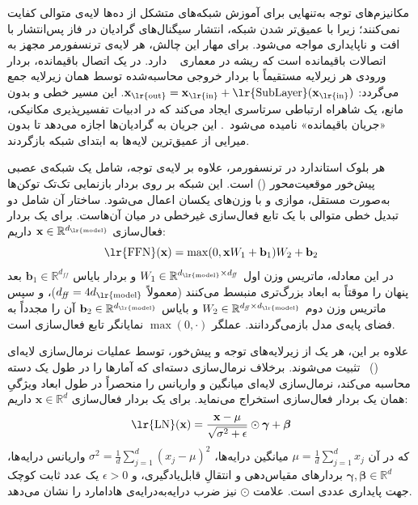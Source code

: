 مکانیزم‌های توجه به‌تنهایی برای آموزش شبکه‌های متشکل از ده‌ها لایه‌ی متوالی کفایت نمی‌کنند؛ زیرا با عمیق‌تر شدن شبکه، انتشار سیگنال‌های گرادیان در فاز پس‌انتشار با افت و ناپایداری مواجه می‌شود. برای مهار این چالش، هر لایه‌ی ترنسفورمر مجهز به اتصالات باقیمانده است که ریشه در معماری ~\cite{he2016deep} دارد. در یک اتصال باقیمانده، بردار ورودی هر زیرلایه مستقیماً با بردار خروجی محاسبه‌شده توسط همان زیرلایه جمع می‌گردد: $\mathbf{x}_{\text{\lr{out}}} = \mathbf{x}_{\text{\lr{in}}} + \text{\lr{SubLayer}}(\mathbf{x}_{\text{\lr{in}}})$. این مسیر خطی و بدون مانع، یک شاهراه ارتباطی سرتاسری ایجاد می‌کند که در ادبیات تفسیرپذیری مکانیکی، «جریان باقیمانده» نامیده می‌شود~\cite{elhage2021mathematical}. این جریان به گرادیان‌ها اجازه می‌دهد تا بدون میرایی از عمیق‌ترین لایه‌ها به ابتدای شبکه بازگردند.

هر بلوک استاندارد در ترنسفورمر، علاوه بر لایه‌ی توجه، شامل یک شبکه‌ی عصبی پیش‌خور موقعیت‌محور () است. این شبکه بر روی بردار بازنمایی تک‌تک توکن‌ها به‌صورت مستقل، موازی و با وزن‌های یکسان اعمال می‌شود. ساختار آن شامل دو تبدیل خطی متوالی با یک تابع فعال‌سازی غیرخطی در میان آن‌هاست. برای یک بردار فعال‌سازی $\mathbf{x} \in \mathbb{R}^{d_{\text{\lr{model}}}}$ داریم:
\begin{equation}\label{eq:chap2_ffn}
    \text{\lr{FFN}}(\mathbf{x}) = \max(0, \mathbf{x}W_1 + \mathbf{b}_1)W_2 + \mathbf{b}_2
\end{equation}
در این معادله، ماتریس وزن اول $W_1 \in \mathbb{R}^{d_{\text{\lr{model}}} \times d_{\mathit{ff}}}$ و بردار بایاس $\mathbf{b}_1 \in \mathbb{R}^{d_{\mathit{ff}}}$ بعد پنهان را موقتاً به ابعاد بزرگ‌تری منبسط می‌کنند (معمولاً $d_{\mathit{ff}} = 4d_{\text{\lr{model}}}$)، و سپس ماتریس وزن دوم $W_2 \in \mathbb{R}^{d_{\mathit{ff}} \times d_{\text{\lr{model}}}}$ و بایاس $\mathbf{b}_2 \in \mathbb{R}^{d_{\text{\lr{model}}}}$ آن را مجدداً به فضای پایه‌ی مدل بازمی‌گردانند. عملگر $\max(0, \cdot)$ نمایانگر تابع فعال‌سازی  است.

علاوه بر این، هر یک از زیرلایه‌های توجه و پیش‌خور، توسط عملیات نرمال‌سازی لایه‌ای ()~\cite{ba2016layer} تثبیت می‌شوند. برخلاف نرمال‌سازی دسته‌ای که آمارها را در طول یک دسته محاسبه می‌کند، نرمال‌سازی لایه‌ای میانگین و واریانس را منحصراً در طول ابعاد ویژگیِ همان یک بردار فعال‌سازی استخراج می‌نماید. برای یک بردار فعال‌سازی $\mathbf{x} \in \mathbb{R}^d$ داریم:
\begin{equation}\label{eq:chap2_layernorm}
    \text{\lr{LN}}(\mathbf{x}) = \frac{\mathbf{x} - \mu}{\sqrt{\sigma^2 + \epsilon}} \odot \boldsymbol{\gamma} + \boldsymbol{\beta}
\end{equation}
که در آن $\mu = \frac{1}{d} \sum_{j=1}^d x_j$ میانگین درایه‌ها، $\sigma^2 = \frac{1}{d} \sum_{j=1}^d {(x_j - \mu)}^2$ واریانس درایه‌ها، $\boldsymbol{\gamma}, \boldsymbol{\beta} \in \mathbb{R}^d$ بردارهای مقیاس‌دهی و انتقالِ قابل‌یادگیری، و $\epsilon > 0$ یک عدد ثابت کوچک جهت پایداری عددی است. علامت $\odot$ نیز ضرب درایه‌به‌درایه‌ی هادامارد را نشان می‌دهد.

